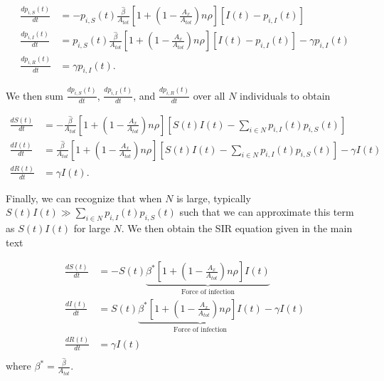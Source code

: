 \documentclass[11pt]{article}
\begin{document}
\begin{equation}
    \begin{aligned}
        \frac{d p_{i, S}(t)}{dt} &= -p_{i, S}(t) \frac{\hat{\beta}}{A_{tot}} \left[1 + (1 - \frac{A_x}{A_{tot}}) n \rho \right] [I(t) - p_{i, I}(t)] \\
        \frac{d p_{i, I}(t)}{dt} &= p_{i, S}(t) \frac{\hat{\beta}}{A_{tot}} \left[1 + (1 - \frac{A_x}{A_{tot}}) n \rho \right] [I(t) - p_{i, I}(t)] - \gamma p_{i, I}(t) \\
        \frac{d p_{i, R}(t)}{dt} &= \gamma p_{i, I}(t).
    \end{aligned}
    \label{eq:sir_individual_simplified}
\end{equation}

We then sum $\frac{d p_{i, S}(t)}{dt}$, $\frac{d p_{i, I}(t)}{dt}$, and $\frac{d p_{i, R}(t)}{dt}$ over all $N$ individuals to obtain

\begin{equation}
    \begin{aligned}
        \frac{d S(t)}{dt} &= -\frac{\hat{\beta}}{A_{tot}} \left[1 + (1 - \frac{A_x}{A_{tot}}) n \rho \right] [S(t)I(t) - \sum_{i \in N} p_{i, I}(t) p_{i, S}(t)] \\
        \frac{d I(t)}{dt} &= \frac{\hat{\beta}}{A_{tot}} \left[1 + (1 - \frac{A_x}{A_{tot}}) n \rho \right] [S(t)I(t) - \sum_{i \in N} p_{i, I}(t) p_{i, S}(t)] - \gamma I(t) \\
        \frac{d R(t)}{dt} &= \gamma I(t).
    \end{aligned}
    \label{eq:sir_population_full}
\end{equation}

Finally, we can recognize that when $N$ is large, typically $S(t)I(t) \gg \sum_{i \in N} p_{i, I}(t) p_{i, S}(t)$ such that we can approximate this term as $S(t)I(t)$ for large $N$. We then obtain the SIR equation given in the main text

\begin{equation}
    \begin{aligned}
        \frac{d S(t)}{dt} &= - S(t) \underbrace{\beta^* [1 + (1 - \frac{A_x}{A_{tot}})n\rho] I(t)}_{\text{Force of infection}}  \\
        \frac{d I(t)}{dt} &=  S(t) \underbrace{\beta^* [1 + (1 - \frac{A_x}{A_{tot}})n\rho] I(t)}_{\text{Force of infection}} - \gamma I(t) \\
        \frac{d R(t)}{dt} &= \gamma I(t) \\
    \end{aligned}
    \label{eq:sir_with_corr}
\end{equation}
where $\beta^* = \frac{\hat{\beta}}{A_{tot}}$.
\end{document}
